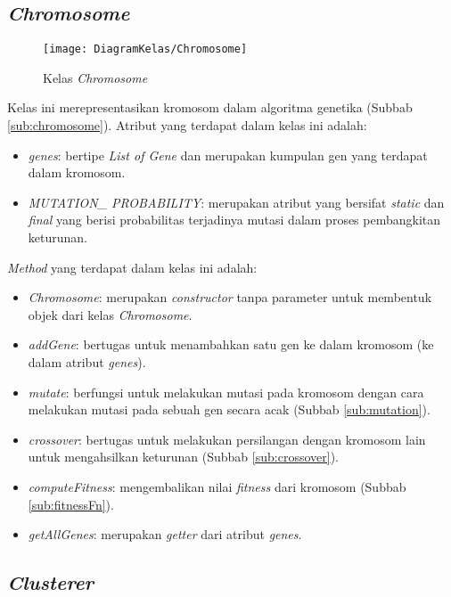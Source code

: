 \subsection{\textit{Chromosome}}

\begin{figure}[h]
	\begin{center}
		\texttt{[image: DiagramKelas/Chromosome]}
		\caption{Kelas \textit{Chromosome}}
		\label{fig:kelasChromosome}
	\end{center}
\end{figure}

Kelas ini merepresentasikan kromosom dalam algoritma genetika (Subbab \ref{sub:chromosome}). Atribut yang terdapat dalam kelas ini adalah:

\begin{itemize}
	\item \textit{genes}: bertipe \textit{List of Gene} dan merupakan kumpulan gen yang terdapat dalam kromosom.
	\item \textit{MUTATION\_ PROBABILITY}: merupakan atribut yang bersifat \textit{static} dan \textit{final} yang berisi probabilitas terjadinya mutasi dalam proses pembangkitan keturunan.
\end{itemize}

\textit{Method} yang terdapat dalam kelas ini adalah:

\begin{itemize}
	\item \textit{Chromosome}: merupakan \textit{constructor} tanpa parameter untuk membentuk objek dari kelas \textit{Chromosome}.
	\item \textit{addGene}: bertugas untuk menambahkan satu gen ke dalam kromosom (ke dalam atribut \textit{genes}).
	\item \textit{mutate}: berfungsi untuk melakukan mutasi pada kromosom dengan cara melakukan mutasi pada sebuah gen secara acak (Subbab \ref{sub:mutation}).
	\item \textit{crossover}: bertugas untuk melakukan persilangan dengan kromosom lain untuk mengahsilkan keturunan (Subbab \ref{sub:crossover}).
	\item \textit{computeFitness}: mengembalikan nilai \textit{fitness} dari kromosom (Subbab \ref{sub:fitnessFn}).
	\item \textit{getAllGenes}: merupakan \textit{getter} dari atribut \textit{genes}.
\end{itemize}

\subsection{\textit{Clusterer}}

